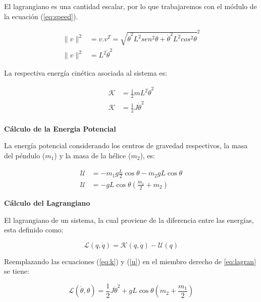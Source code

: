 \documentclass[12pt]{article}
\begin{document}
El lagrangiano es una cantidad escalar, por lo que trabajaremos con el módulo de la ecuación (\ref{eq:speed}).

\begin{equation}
    \begin{split}
        \|v\|^2&=v.v^T=\sqrt{\dot{\theta}^2L^2sen^2{\theta}+\dot{\theta}^2L^2cos^2{\theta}}^2\\
        \|v\|^2&=L^2\dot{\theta}^2
    \end{split}
    \label{eq:speed_mod}
\end{equation}

La respectiva energía cinética asociada al sistema es:

\begin{equation}
    \begin{split}
        \mathcal{K} &= \frac{1}{2}mL^2\dot\theta^2\\
        \mathcal{K} &= \frac{1}{2}J\dot\theta^2\\
    \end{split}
    \label{eq:k}
\end{equation}

\textbf{Cálculo de la Energia Potencial}

La energía potencial considerando los centros de gravedad respectivos, la masa del péndulo ($m_1$) y la masa de la hélice ($m_2$), es:

\begin{equation}
    \begin{split}
        \mathcal{U} &=  -m_1g\frac{L}{2}\cos{\theta} -m_2gL\cos{\theta} \\
        \mathcal{U} &= -gL\cos{\theta(\frac{m_1}{2}+m_2)}
    \end{split}
    \label{u}
\end{equation}

\textbf{Cálculo del Lagrangiano}

El lagrangiano de un sistema, la cual proviene de la diferencia entre las energías, esta definido como:

\begin{equation}
    \mathcal{L}(q,\dot{q})=\mathcal{K}(q,\dot{q})-\mathcal{U}(q)
    \label{eq:lagran}
\end{equation}

Reemplazando las ecuaciones (\ref{eq:k}) y (\ref{u}) en el miembro derecho de \ref{eq:lagran} se tiene:

\begin{equation}
    \mathcal{L}(\dot{\theta},\theta)=\frac{1}{2}J\dot{\theta}^2+gL\cos{\theta}(m_2+\frac{m_1}{2})
\end{equation}
\end{document}
